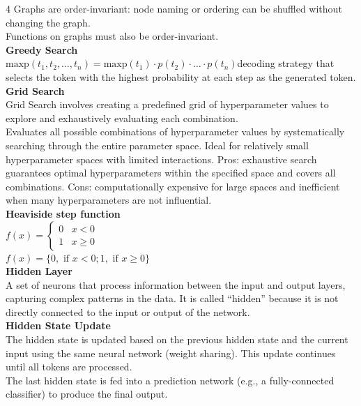 \documentclass[8pt]{extarticle}
\begin{document}
\begin{multicols}{4}
Graphs are order-invariant: node naming or ordering can be shuffled without changing the graph.\\
Functions on graphs must also be order-invariant.\\
\vspace{2pt}\textbf{Greedy Search}\\
$ \text{maxp}(t_1, t_2, \dots, t_n) = \text{maxp}(t_1) \cdot p(t_2) \cdot \dots \cdot p(t_n) $\A decoding strategy that selects the token with the highest probability at each step as the generated token.\\
\vspace{2pt}\textbf{Grid Search}\\
Grid Search involves creating a predefined grid of hyperparameter values to explore and exhaustively evaluating each combination.\\
Evaluates all possible combinations of hyperparameter values by systematically searching through the entire parameter space. Ideal for relatively small hyperparameter spaces with limited interactions. Pros: exhaustive search guarantees optimal hyperparameters within the specified space and covers all combinations. Cons: computationally expensive for large spaces and inefficient when many hyperparameters are not influential.\\
\vspace{2pt}\textbf{Heaviside step function}\\
$f(x)=\begin{cases}0 & x<0\\1 & x\ge 0\end{cases}$\\
$f(x)=\{0,\text{ if }x<0; 1,\text{ if }x\ge 0\}$\\
\vspace{2pt}\textbf{Hidden Layer}\\
A set of neurons that process information between the input and output layers, capturing complex patterns in the data. It is called ``hidden'' because it is not directly connected to the input or output of the network.\\
\vspace{2pt}\textbf{Hidden State Update}\\
The hidden state is updated based on the previous hidden state and the current input using the same neural network (weight sharing). This update continues until all tokens are processed.\\
The last hidden state is fed into a prediction network (e.g., a fully-connected classifier) to produce the final output.\\

\end{multicols}
\end{document}
